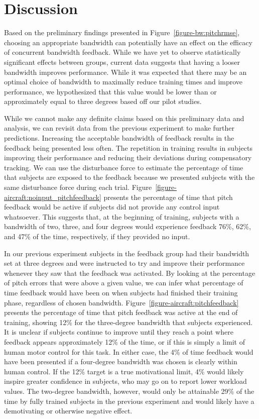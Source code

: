 \section{Discussion}

Based on the preliminary findings presented in Figure~\ref{figure-bw:pitchrmse}, choosing an appropriate bandwidth can potentially have an effect on the efficacy of concurrent bandwidth feedback.
While we have yet to observe statistically significant effects between groups, current data suggests that having a looser bandwidth improves performance.
While it was expected that there may be an optimal choice of bandwidth to maximally reduce training times and improve performance, we hypothesized that this value would be lower than or approximately equal to three degrees based off our pilot studies.

While we cannot make any definite claims based on this preliminary data and analysis, we can revisit data from the previous experiment to make further predictions.
Increasing the acceptable bandwidth of feedback results in the feedback being presented less often.
The repetition in training results in subjects improving their performance and reducing their deviations during compensatory tracking.
We can use the disturbance force to estimate the percentage of time that subjects are exposed to the feedback because we presented subjects with the same disturbance force during each trial.
Figure~\ref{figure-aircraft:noinput_pitchfeedback} presents the percentage of time that pitch feedback would be active if subjects did not provide any control input whatsoever.
This suggests that, at the beginning of training, subjects with a bandwidth of two, three, and four degrees would experience feedback 76\%, 62\%, and 47\% of the time, respectively, if they provided no input.

In our previous experiment subjects in the feedback group had their bandwidth set at three degrees and were instructed to try and improve their performance whenever they saw that the feedback was activated.
By looking at the percentage of pitch errors that were above a given value, we can infer what percentage of time feedback would have been on when subjects had finished their training phase, regardless of chosen bandwidth.
Figure~\ref{figure-aircraft:pitchfeedback} presents the percentage of time that pitch feedback was active at the end of training, showing 12\% for the three-degree bandwidth that subjects experienced.
It is unclear if subjects continue to improve until they reach a point where feedback appears approximately 12\% of the time, or if this is simply a limit of human motor control for this task.
In either case, the 4\% of time feedback would have been presented if a four-degree bandwidth was chosen is clearly within human control.
If the 12\% target is a true motivational limit, 4\% would likely inspire greater confidence in subjects, who may go on to report lower workload values.
The two-degree bandwidth, however, would only be attainable 29\% of the time by fully trained subjects in the previous experiment and would likely have a demotivating or otherwise negative effect.

